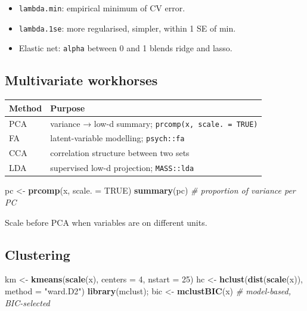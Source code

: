 \documentclass[
]{article}
\newenvironment{Shaded}{\begin{snugshade}}{\end{snugshade}}
\newcommand{\AttributeTok}[1]{\textcolor[rgb]{0.13,0.29,0.53}{#1}}
\newcommand{\CommentTok}[1]{\textcolor[rgb]{0.56,0.35,0.01}{\textit{#1}}}
\newcommand{\ConstantTok}[1]{\textcolor[rgb]{0.56,0.35,0.01}{#1}}
\newcommand{\DecValTok}[1]{\textcolor[rgb]{0.00,0.00,0.81}{#1}}
\newcommand{\FunctionTok}[1]{\textcolor[rgb]{0.13,0.29,0.53}{\textbf{#1}}}
\newcommand{\NormalTok}[1]{#1}
\newcommand{\OtherTok}[1]{\textcolor[rgb]{0.56,0.35,0.01}{#1}}
\newcommand{\StringTok}[1]{\textcolor[rgb]{0.31,0.60,0.02}{#1}}
\newcounter{none} %
\providecommand{\tightlist}{%
  \setlength{\itemsep}{0pt}\setlength{\parskip}{0pt}}
\begin{document}
\begin{itemize}
\tightlist
\item
  \texttt{lambda.min}: empirical minimum of CV error.
\item
  \texttt{lambda.1se}: more regularised, simpler, within 1 SE of min.
\item
  Elastic net: \texttt{alpha} between 0 and 1 blends ridge and lasso.
\end{itemize}

\subsection{Multivariate workhorses}\label{multivariate-workhorses}

{\def\LTcaptype{none} %
\begin{longtable}[]{@{}ll@{}}
\toprule\noalign{}
Method & Purpose \\
\midrule\noalign{}
\endhead
\bottomrule\noalign{}
\endlastfoot
PCA & variance → low-d summary; \texttt{prcomp(x,\ scale.\ =\ TRUE)} \\
FA & latent-variable modelling; \texttt{psych::fa} \\
CCA & correlation structure between two sets \\
LDA & supervised low-d projection; \texttt{MASS::lda} \\
\end{longtable}
}

\begin{Shaded}
\begin{Highlighting}[]
\NormalTok{pc }\OtherTok{\textless{}{-}} \FunctionTok{prcomp}\NormalTok{(x, }\AttributeTok{scale. =} \ConstantTok{TRUE}\NormalTok{)}
\FunctionTok{summary}\NormalTok{(pc)   }\CommentTok{\# proportion of variance per PC}
\end{Highlighting}
\end{Shaded}

Scale before PCA when variables are on different units.

\subsection{Clustering}\label{clustering}

\begin{Shaded}
\begin{Highlighting}[]
\NormalTok{km }\OtherTok{\textless{}{-}} \FunctionTok{kmeans}\NormalTok{(}\FunctionTok{scale}\NormalTok{(x), }\AttributeTok{centers =} \DecValTok{4}\NormalTok{, }\AttributeTok{nstart =} \DecValTok{25}\NormalTok{)}
\NormalTok{hc }\OtherTok{\textless{}{-}} \FunctionTok{hclust}\NormalTok{(}\FunctionTok{dist}\NormalTok{(}\FunctionTok{scale}\NormalTok{(x)), }\AttributeTok{method =} \StringTok{"ward.D2"}\NormalTok{)}
\FunctionTok{library}\NormalTok{(mclust); bic }\OtherTok{\textless{}{-}} \FunctionTok{mclustBIC}\NormalTok{(x)      }\CommentTok{\# model{-}based, BIC{-}selected}
\end{Highlighting}
\end{Shaded}
\end{document}
